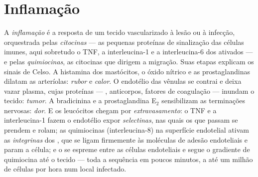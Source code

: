 \section{Inflamação}

\begin{definition}\label{def:b3:innate-immunity:inflammation}
A \emph{inflamação} é a resposta de um tecido vascularizado à lesão ou à
infecção, orquestrada pelas \emph{citocinas} --- as pequenas proteínas
de sinalização das células imunes, aqui sobretudo o TNF, a
interleucina-1 e a interleucina-6 dos  ativados --- e pelas
\emph{quimiocinas}, as citocinas que dirigem a migração. Suas etapas
explicam os sinais de Celso. A histamina dos mastócitos, o óxido
nítrico e as prostaglandinas dilatam as arteríolas: \emph{rubor} e
\emph{calor}. O endotélio das vênulas se contrai e deixa vazar plasma,
cujas proteínas --- , anticorpos, fatores de coagulação ---
inundam o tecido: \emph{tumor}. A bradicinina e a prostaglandina
E$_{2}$ sensibilizam as terminações nervosas: \emph{dor}. E os
leucócitos chegam por \emph{extravasamento}: o TNF e a interleucina-1
fazem o endotélio expor \emph{selectinas}, nas quais os  que
passam se prendem e rolam; as quimiocinas (interleucina-8) na
superfície endotelial ativam as \emph{integrinas} dos , que
se ligam firmemente às moléculas de adesão endoteliais e param a
célula; e o  se espreme entre as células endoteliais e segue
o gradiente de quimiocina até o tecido --- toda a sequência em poucos
minutos, a até um milhão de células por hora num local infectado.
\end{definition}

